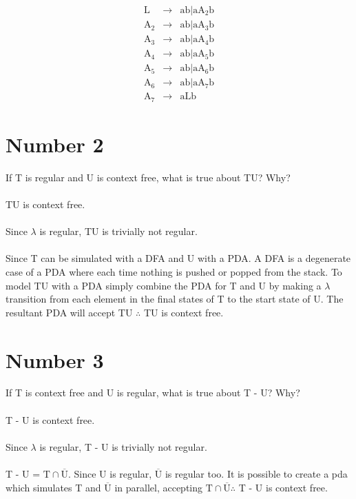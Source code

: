 \documentclass[12pt,a4paper,twoside]{article}  %
\begin{document}
\begin{enumerate}
\begin{eqnarray}
\textrm{L}        &\rightarrow& \textrm{ab} | \textrm{a}\textrm{A}_2\textrm{b} \\
\textrm{A}_2      &\rightarrow& \textrm{ab} | \textrm{a}\textrm{A}_3\textrm{b} \\
\textrm{A}_3      &\rightarrow& \textrm{ab} | \textrm{a}\textrm{A}_4\textrm{b} \\
\textrm{A}_4      &\rightarrow& \textrm{ab} | \textrm{a}\textrm{A}_5\textrm{b} \\
\textrm{A}_5      &\rightarrow& \textrm{ab} | \textrm{a}\textrm{A}_6\textrm{b} \\
\textrm{A}_6      &\rightarrow& \textrm{ab} | \textrm{a}\textrm{A}_7\textrm{b} \\
\textrm{A}_7      &\rightarrow& \textrm{aLb}
\end{eqnarray}

\end{enumerate}

\section{Number 2}

If T is regular and U is context free, what is true about TU?
Why?\\\\
TU is context free.\\\\
Since $\lambda$ is regular, TU is trivially not regular.\\\\
Since T can be simulated with a DFA and U with a PDA. A DFA is a
degenerate case of a PDA where each time nothing is pushed or popped
from the stack. To model TU with a PDA simply combine the PDA for T
and U by making a $\lambda$ transition from each element in the final
states of T to the start state of U. The resultant PDA will accept TU
$\therefore$ TU is context free.

\section{Number 3}

If T is context free and U is regular, what is true about T - U?
Why?\\\\
T - U is context free.\\\\
Since $\lambda$ is regular, T - U is trivially not regular.\\\\
T - U = $\textrm{T} \cap \overline{\textrm{U}}$. Since U is regular,
$\overline{\textrm{U}}$ is regular too. It is possible to create a pda
which simulates T and $\overline{\textrm{U}}$ in parallel, accepting
$\textrm{T} \cap \overline{\textrm{U}} \therefore$ T - U is context
free.
\end{document}
